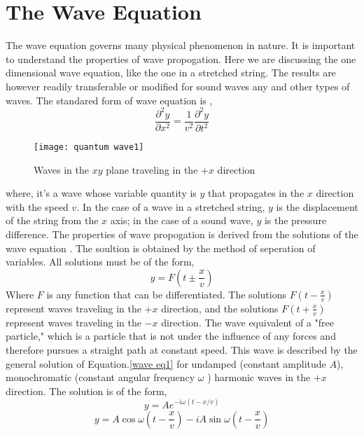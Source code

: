 \section{The Wave Equation}
The wave equation governs many physical phenomenon in nature. It is important to  understand the properties of wave propogation. Here we are discussing the one dimensional wave equation, like the one in a stretched string. The results are however readily transferable or modified for sound waves any and other types of waves.
The standared form of wave equation is ,
\begin{equation}\label{wave eq1}
\frac{\partial^{2} y}{\partial x^{2}}=\frac{1}{v^{2}} \frac{\partial^{2} y}{\partial t^{2}}
\end{equation}
\begin{figure}[H]
	\centering
	\texttt{[image: quantum wave1]}
	\caption{Waves in the $x y$ plane traveling in the $+x$ direction }
	\label{quantum wave1}
\end{figure}
where, it's  a wave whose variable quantity is $y$ that propagates in the $x$ direction with the speed $v$. In the case of a wave in a stretched string, $y$ is the displacement of the string from the $x$ axis; in the case of a sound wave, $y$ is the pressure difference. The properties of wave propogation is derived from the solutions of the wave equation . The soultion is obtained by the method of seperation of variables. All solutions must be of the form,
\begin{equation}\label{wave eq2}
y=F\left(t \pm \frac{x}{v}\right)
\end{equation}
Where $ F $ is any function that can be differentiated. The solutions $F(t-\frac{x}{v})$ represent waves traveling in the $+x$ direction, and the solutions $F(t+\frac{x}{v})$ represent waves traveling in the $-x$ direction. 
The wave equivalent of a "free particle," which is a particle that is not under the influence of any forces and therefore pursues a straight path at constant speed. This wave is described by the general solution of Equation.\ref*{wave eq1} for undamped (constant amplitude $ A $), monochromatic (constant angular frequency $\omega$ ) harmonic waves in the $+x$ direction. The solution is of the form,
\begin{equation}\label{wave eq3}
y=A e^{-i \omega(t-x / v)}
\end{equation}
\begin{equation}\label{wave eq4}
y=A \cos \omega\left(t-\frac{x}{v}\right)-i A \sin \omega\left(t-\frac{x}{v}\right)
\end{equation}

